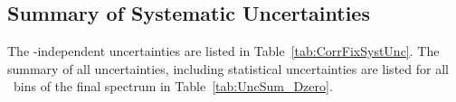 \subsection{Summary of Systematic Uncertainties}

The \pt-independent uncertainties are listed in Table~\ref{tab:CorrFixSystUnc}. 
The summary of all uncertainties, including statistical uncertainties are listed for all \ptchjet\ bins of the final spectrum in Table~\ref{tab:UncSum_Dzero}.
%


    
